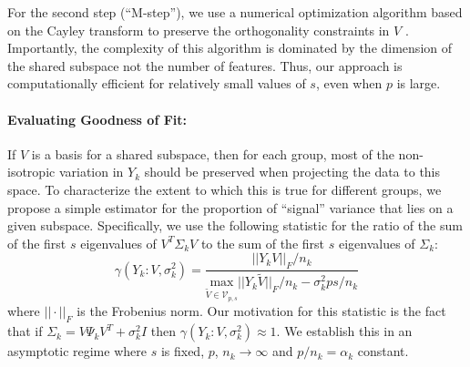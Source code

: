 \documentclass[12pt]{article}
\begin{document}
For the second step (``M-step''), we use a numerical optimization algorithm based on
the Cayley transform to preserve the orthogonality constraints in $V$
\citep{Wen2013}.  Importantly, the complexity of this algorithm is
dominated by the dimension of the shared subspace not the number of
features.  Thus, our approach is computationally efficient for
relatively small values of $s$, even when $p$ is large.

\paragraph{Evaluating Goodness of Fit:}

If $V$ is a basis for a shared subspace, then for each group, most
of the non-isotropic variation in $Y_k$ should be preserved when
projecting the data to this space.  To characterize the extent to
which this is true for different groups, we propose a simple estimator
for the proportion of ``signal'' variance that lies on a given
subspace.  Specifically, we use the following statistic for the ratio
of the sum of the first $s$ eigenvalues of
$V^T \Sigma_k V$ to the sum of the first $s$ eigenvalues
of $\Sigma_k$:
%
\begin{equation}
\gamma(Y_k: V, \sigma_k^2) = \frac{||Y_kV||_F/n_k}{\underset{\widetilde{V} \in \mathcal{V}_{p, s}}{\text{max}}
  ||Y_k\widetilde{V}||_F/n_k - \sigma_k^2ps/n_k}
\label{eqn:ratio}
\end{equation}
%
\noindent where $||\cdot||_F$ is the Frobenius norm. Our motivation for
this statistic is the fact that if
$\Sigma_k = V\Psi_kV^T + \sigma_k^2I$ then
$\gamma(Y_k: V, \sigma_k^2) \approx 1$.  We establish
this in an asymptotic regime where $s$ is fixed, $p$,
$n_k \rightarrow \infty$ and $p/n_k = \alpha_k$ constant.
\end{document}
